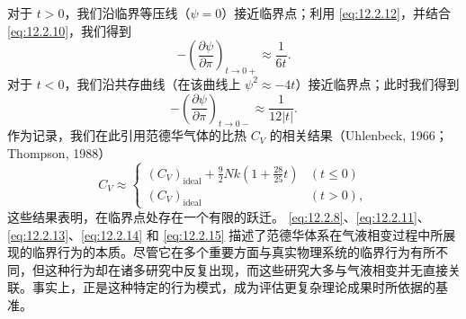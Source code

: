 对于 \(t > 0\)，我们沿临界等压线（\(\psi = 0\)）接近临界点；利用 \autoref{eq:12.2.12}，并结合 \autoref{eq:12.2.10}，我们得到
\begin{equation}\tag{12.2.13}\label{eq:12.2.13}
- \left( \frac { \partial \psi } { \partial \pi } \right) _ { t \rightarrow 0 + } \approx \frac { 1 } { 6 t } .
\end{equation}
对于 \(t < 0\)，我们沿共存曲线（在该曲线上 \(\psi^2 \approx -4t\)）接近临界点；此时我们得到
\begin{equation}\tag{12.2.14}\label{eq:12.2.14}
- \left( \frac { \partial \psi } { \partial \pi } \right) _ { t \rightarrow 0 - } \approx \frac { 1 } { 12 | t | } .
\end{equation}
作为记录，我们在此引用范德华气体的比热 \(C_{V}\) 的相关结果（Uhlenbeck, 1966；Thompson, 1988）
\begin{equation}\tag{12.2.15}\label{eq:12.2.15}
C _ { V } \approx \left\{ \begin{array}{ll} { ( C _ { V } ) _ { \mathrm { i d e a l } } + \frac { 9 } { 2 } N k \left( 1 + \frac { 28 } { 25 } t \right) } & {  ( t \leq 0 ) } \\{ ( C _ { V } ) _ { \mathrm { i d e a l } } } & {  ( t > 0 ) , } \end{array} \right.
\end{equation}
这些结果表明，在临界点处存在一个有限的跃迁。
\autoref{eq:12.2.8}、\autoref{eq:12.2.11}、\autoref{eq:12.2.13}、\autoref{eq:12.2.14} 和 \autoref{eq:12.2.15} 描述了范德华体系在气液相变过程中所展现的临界行为的本质。尽管它在多个重要方面与真实物理系统的临界行为有所不同，但这种行为却在诸多研究中反复出现，而这些研究大多与气液相变并无直接关联。事实上，正是这种特定的行为模式，成为评估更复杂理论成果时所依据的基准。

